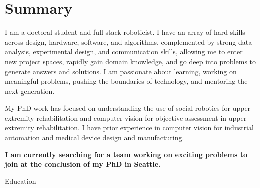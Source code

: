 \documentclass[10pt, letter]{article}
\begin{document}


\section*{Summary}
\hspace*{\fill}\begin{minipage}{\textwidth-\cvindent}
I am a doctoral student and full stack roboticist.
I have an array of hard skills across design, hardware, software, and algorithms, complemented by strong data analysis, experimental design, and communication skills, allowing me to enter new project spaces, rapidly gain domain knowledge, and go deep into problems to generate answers and solutions. 
I am passionate about learning, working on meaningful problems, pushing the boundaries of technology, and mentoring the next generation.  

My PhD work has focused on understanding the use of social robotics for upper extremity rehabilitation and computer vision for objective assessment in upper extremity rehabilitation.
I have prior experience in computer vision for industrial automation and medical device design and manufacturing. 

\textbf{I am currently searching for a team working on exciting problems to join at the conclusion of my PhD in Seattle.}
\end{minipage}

\begin{cvsection}{Education}




\end{cvsection}
\end{document}
